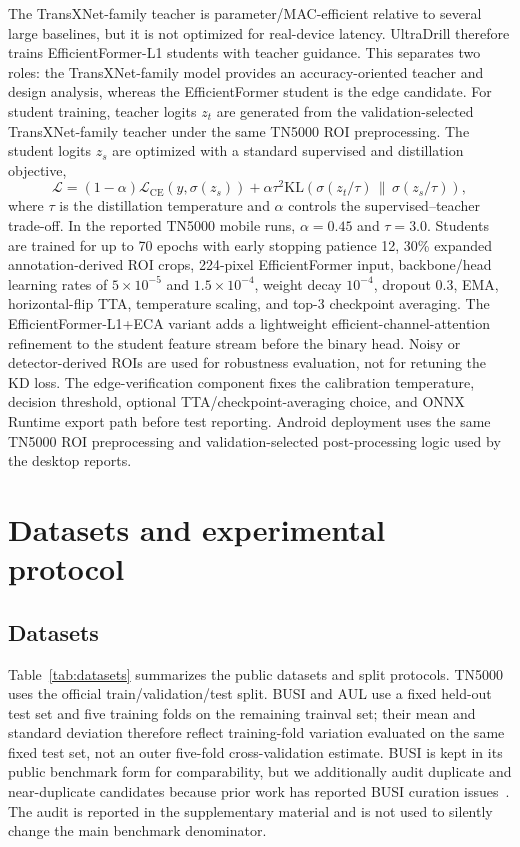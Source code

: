 \documentclass[preprint,12pt]{elsarticle}
\begin{document}
The TransXNet-family teacher is parameter/MAC-efficient relative to several large baselines, but it is not optimized for real-device latency. UltraDrill therefore trains EfficientFormer-L1 students with teacher guidance. This separates two roles: the TransXNet-family model provides an accuracy-oriented teacher and design analysis, whereas the EfficientFormer student is the edge candidate. For student training, teacher logits $z_t$ are generated from the validation-selected TransXNet-family teacher under the same TN5000 ROI preprocessing. The student logits $z_s$ are optimized with a standard supervised and distillation objective,
\begin{equation}
    \mathcal{L} =
    (1-\alpha)\mathcal{L}_{\mathrm{CE}}(y,\sigma(z_s))
    + \alpha \tau^2
    \mathrm{KL}\left(\sigma(z_t/\tau)\,\|\,\sigma(z_s/\tau)\right),
\end{equation}
where $\tau$ is the distillation temperature and $\alpha$ controls the supervised--teacher trade-off. In the reported TN5000 mobile runs, $\alpha=0.45$ and $\tau=3.0$. Students are trained for up to 70 epochs with early stopping patience 12, 30\% expanded annotation-derived ROI crops, 224-pixel EfficientFormer input, backbone/head learning rates of $5\times10^{-5}$ and $1.5\times10^{-4}$, weight decay $10^{-4}$, dropout 0.3, EMA, horizontal-flip TTA, temperature scaling, and top-3 checkpoint averaging. The EfficientFormer-L1+ECA variant adds a lightweight efficient-channel-attention refinement to the student feature stream before the binary head. Noisy or detector-derived ROIs are used for robustness evaluation, not for retuning the KD loss. The edge-verification component fixes the calibration temperature, decision threshold, optional TTA/checkpoint-averaging choice, and ONNX Runtime export path before test reporting. Android deployment uses the same TN5000 ROI preprocessing and validation-selected post-processing logic used by the desktop reports.

\section{Datasets and experimental protocol}
\label{sec:protocol}

\subsection{Datasets}

Table~\ref{tab:datasets} summarizes the public datasets and split protocols. TN5000 uses the official train/validation/test split. BUSI and AUL use a fixed held-out test set and five training folds on the remaining trainval set; their mean and standard deviation therefore reflect training-fold variation evaluated on the same fixed test set, not an outer five-fold cross-validation estimate. BUSI is kept in its public benchmark form for comparability, but we additionally audit duplicate and near-duplicate candidates because prior work has reported BUSI curation issues~\cite{aumente2025curatedbusi}. The audit is reported in the supplementary material and is not used to silently change the main benchmark denominator.
\end{document}
